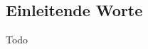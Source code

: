 \documentclass[
a4paper,   
headsepline, 
fleqn,     
11pt
]{scrartcl}
\begin{document}

\subsection*{Einleitende Worte}
Todo 

\appendix  


\end{document}
